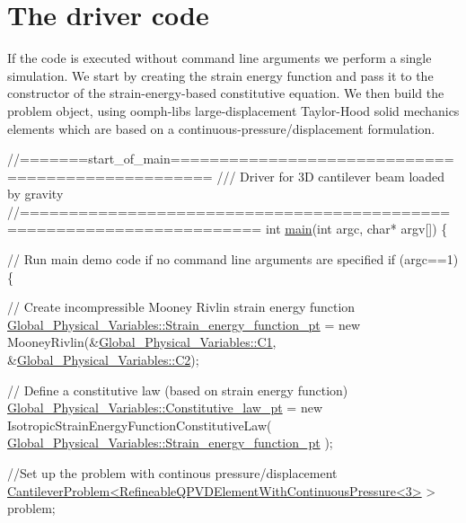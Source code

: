  

\hypertarget{index_main}{}\section{The driver code}\label{index_main}
If the code is executed without command line arguments we perform a single simulation. We start by creating the strain energy function and pass it to the constructor of the strain-\/energy-\/based constitutive equation. We then build the problem object, using {\ttfamily oomph-\/lib\textquotesingle{}s} large-\/displacement Taylor-\/\+Hood solid mechanics elements which are based on a continuous-\/pressure/displacement formulation.

 
\begin{DoxyCodeInclude}
\textcolor{comment}{//=======start\_of\_main==================================================}
\textcolor{comment}{/// Driver for 3D cantilever beam loaded by gravity}
\textcolor{comment}{}\textcolor{comment}{//======================================================================}
\textcolor{keywordtype}{int} \hyperlink{three__d__cantilever_8cc_a0ddf1224851353fc92bfbff6f499fa97}{main}(\textcolor{keywordtype}{int} argc, \textcolor{keywordtype}{char}* argv[])
\{

 \textcolor{comment}{// Run main demo code if no command line arguments are specified}
 \textcolor{keywordflow}{if} (argc==1)
  \{
   
   \textcolor{comment}{// Create incompressible Mooney Rivlin strain energy function}
   \hyperlink{namespaceGlobal__Physical__Variables_a73135f793690b4386bf83bbefc7bf310}{Global\_Physical\_Variables::Strain\_energy\_function\_pt}
       = 
    \textcolor{keyword}{new} MooneyRivlin(&\hyperlink{namespaceGlobal__Physical__Variables_a849754fa7155c1a31481674ce4845658}{Global\_Physical\_Variables::C1},
                     &\hyperlink{namespaceGlobal__Physical__Variables_af9defd1b5745cce50d2c386b3ac0e0ae}{Global\_Physical\_Variables::C2});
   
   \textcolor{comment}{// Define a constitutive law (based on strain energy function)}
   \hyperlink{namespaceGlobal__Physical__Variables_a2a37fb040c832ee7a086bb13bb02a100}{Global\_Physical\_Variables::Constitutive\_law\_pt} = 
    \textcolor{keyword}{new} IsotropicStrainEnergyFunctionConstitutiveLaw(
     \hyperlink{namespaceGlobal__Physical__Variables_a73135f793690b4386bf83bbefc7bf310}{Global\_Physical\_Variables::Strain\_energy\_function\_pt}
      );
   
   \textcolor{comment}{//Set up the problem with continous pressure/displacement}
   \hyperlink{classCantileverProblem}{CantileverProblem<RefineableQPVDElementWithContinuousPressure<3>}
       > problem;

\end{DoxyCodeInclude}


